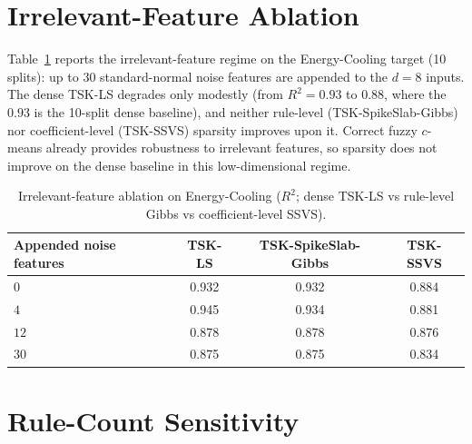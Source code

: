 \documentclass[review,1p,times]{elsarticle}
\begin{document}
\FloatBarrier

\section{Irrelevant-Feature Ablation}

Table~\ref{tab:noise} reports the irrelevant-feature regime on the Energy-Cooling target (10 splits): up to 30 standard-normal noise features are appended to the $d=8$ inputs. The dense TSK-LS degrades only modestly (from $R^2=0.93$ to $0.88$, where the $0.93$ is the 10-split dense baseline), and neither rule-level (TSK-SpikeSlab-Gibbs) nor coefficient-level (TSK-SSVS) sparsity improves upon it. Correct fuzzy $c$-means already provides robustness to irrelevant features, so sparsity does not improve on the dense baseline in this low-dimensional regime.

\begin{table}[htbp]
\centering
\caption{Irrelevant-feature ablation on Energy-Cooling ($R^2$; dense TSK-LS vs rule-level Gibbs vs coefficient-level SSVS).}
\label{tab:noise}
\footnotesize
\begin{tabular}{lccc}
\toprule
Appended noise features & TSK-LS & TSK-SpikeSlab-Gibbs & TSK-SSVS \\
\midrule
$0$  & 0.932 & 0.932 & 0.884 \\
$4$  & 0.945 & 0.934 & 0.881 \\
$12$ & 0.878 & 0.878 & 0.876 \\
$30$ & 0.875 & 0.875 & 0.834 \\
\bottomrule
\end{tabular}
\end{table}

\FloatBarrier

\section{Rule-Count Sensitivity}
\end{document}
